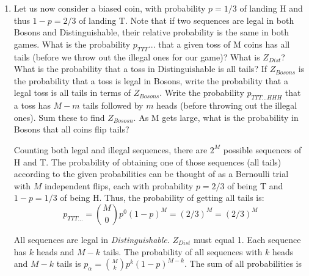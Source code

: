 \begin{enumerate}
\begin{enumerate}
In the \textit{Fermions} game, no two coins can be the same, so there are no legal sequences. Thus, $p = 0$.

The probability of finding a particular legal sequence in Bosons is larger by a constant factor due to discarding the illegal sequences. This factor is just one over the probability of a given toss of the coins being legal, $Z = \sum_{\alpha} p_\alpha$ summed over legal sequences $\alpha$. For part (c), all sequences have equal probabilities $p_{\alpha} = 2^{-M}$, so $Z_{Dist} = (2^M)(2^{-M}) = 1$, and $Z_{Boson}$ is $2^{-M}$ times the number of legal sequences. So for
part (c), the probability to get all heads or all tails is $(p_{TTT}...+p_{HHH}...)/Z$. The normalization constant $Z$ in statistical mechanics is called the partition function, and will be amazingly useful (see Chapter 6).



\item Let us now consider a biased coin, with probability $p = 1/3$ of landing H and thus $1-p = 2/3$ of landing T. Note that if two sequences are legal in both Bosons and Distinguishable, their relative probability is the same in both games. What is the probability $p_{TTT}...$ that a given toss of M coins has all tails (before we throw out the illegal ones for our game)? What is $Z_{Dist}$? What is the probability that a toss in Distinguishable is all tails? If $Z_{Bosons}$ is the probability that a toss is legal in Bosons, write the probability that a legal toss is all tails in terms of $Z_{Bosons}$. Write the probability $p_{TTT...HHH}$ that a toss has $M-m$ tails followed by $m$ heads (before
throwing out the illegal ones). Sum these
to find $Z_{Bososn}$. As M gets large, what is the probability in Bosons that all coins flip tails?


Counting both legal and illegal sequences, there are $2^M$ possible sequences of H and T.
The probability of obtaining one of those sequences (all tails) according to the given probabilities can be thought of as a Bernoulli trial with $M$ independent flips, each with probability $p = 2/3$ of being T and $1-p = 1/3$ of being H. Thus, the probability of getting all tails is:
$$
p_{TTT...} = \binom{M}{0} p^0 (1-p)^{M} = (2/3)^{M} = (2/3)^M
$$

All sequences are legal in \textit{Distinguishable}. $Z_{Dist}$ must equal 1. Each sequence has $k$ heads and $M-k$ tails. The probability of all sequences with $k$ heads and $M-k$ tails is $p_{\alpha} = \binom{M}{k} p^{k} (1-p)^{M-k}$. The sum of all probabilities is


\end{enumerate}
\end{enumerate}
